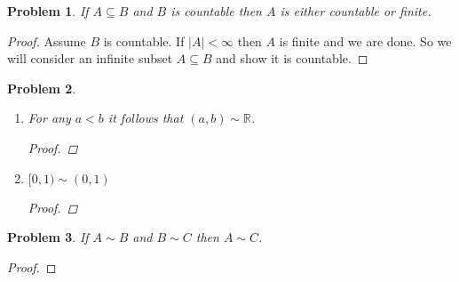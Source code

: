 \documentclass[12pt]{article}
\newtheorem{problem}{Problem}
\newcommand{\II}{\ensuremath{\mathbb I}}
\newcommand{\QQ}{\ensuremath{\mathbb Q}}
\newcommand{\RR}{\ensuremath{\mathbb R}}
\begin{document}
\begin{problem} %
If $A\subseteq B$ and $B$ is countable then $A$ is either countable or finite.
\end{problem}


\begin{proof}
Assume $B$ is countable.  If $|A|<\infty$ then $A$ is finite and we are done.  So we will consider an infinite subset $A\subseteq B$ and show it is countable.
\end{proof}


\begin{problem} %
\phantom{foo}

\renewcommand{\labelenumi}{(\alph{enumi})}
\begin{enumerate}
\item For any $a<b$ it follows that $(a,b) \sim \RR$.

\begin{proof}
\end{proof}

\item $[0,1) \sim (0,1)$

\begin{proof}
\end{proof}

\end{enumerate}
\end{problem}


\begin{problem} %
If $A\sim B$ and $B\sim C$ then $A\sim C$.
\end{problem}


\begin{proof}
\end{proof}
\end{document}
